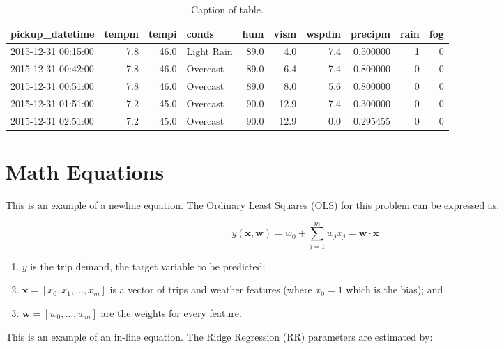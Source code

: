 \documentclass[a4paper, 11pt]{article}
\begin{document}
\begin{table}[H]

    \begin{tabular}{lrrlrrrrrr}
        \toprule
            pickup\_datetime &  tempm &  tempi &      conds &  hum &  vism &  wspdm &  precipm &  rain &  fog \\
        \midrule
        2015-12-31 00:15:00 &    7.8 &   46.0 & Light Rain & 89.0 &   4.0 &    7.4 & 0.500000 &     1 &    0 \\
        2015-12-31 00:42:00 &    7.8 &   46.0 &   Overcast & 89.0 &   6.4 &    7.4 & 0.800000 &     0 &    0 \\
        2015-12-31 00:51:00 &    7.8 &   46.0 &   Overcast & 89.0 &   8.0 &    5.6 & 0.800000 &     0 &    0 \\
        2015-12-31 01:51:00 &    7.2 &   45.0 &   Overcast & 90.0 &  12.9 &    7.4 & 0.300000 &     0 &    0 \\
        2015-12-31 02:51:00 &    7.2 &   45.0 &   Overcast & 90.0 &  12.9 &    0.0 & 0.295455 &     0 &    0 \\
        \bottomrule
        
        \end{tabular}

        \caption{Caption of table.}
        \label{tab:table-name}

    \end{table}


\section{Math Equations}

This is an example of a newline equation. The Ordinary Least Squares (OLS) for this problem can be expressed as:

$$y(\mathbf{x}, \mathbf{w}) = w_0 + \sum_{j = 1}^{m} w_j x_j = \mathbf{w} \cdot \mathbf{x} $$

\begin{enumerate} 
    \item $y$ is the trip demand, the target variable to be predicted;
    \item $\mathbf{x} = [x_0, x_1, \ldots, x_m]$ is a vector of trips and weather features (where $x_0 = 1$ which is the bias); and
    \item $\mathbf{w} = [w_0, \ldots, w_m]$ are the weights for every feature.
\end{enumerate}

This is an example of an in-line equation. The Ridge Regression (RR) parameters are estimated by:
\end{document}
